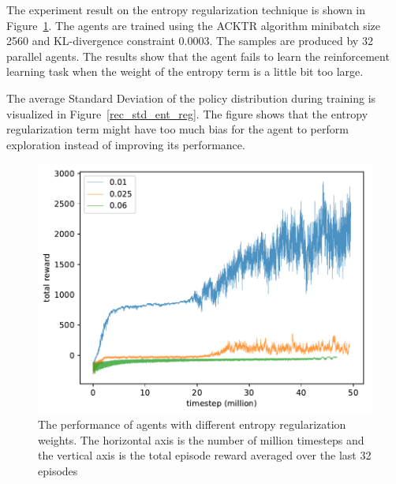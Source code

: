 The experiment result on the entropy regularization technique is shown in Figure~\ref{rec_ent_reg}. The agents are trained using the ACKTR algorithm minibatch size 2560 and KL-divergence constraint 0.0003. The samples are produced by 32 parallel agents. The results show that the agent fails to learn the reinforcement learning task when the weight of the entropy term is a little bit too large. 

The average Standard Deviation of the policy distribution during training is visualized in Figure~\ref{rec_std_ent_reg}. The figure shows that the entropy regularization term might have too much bias for the agent to perform exploration instead of improving its performance.
\begin{figure}[!htbp]
	\includegraphics[width=\textwidth]{images/rec_180609_ent_reg.pdf}
	\centering
	\caption{The performance of agents with different entropy regularization weights. The horizontal axis is the number of million timesteps and the vertical axis is the total episode reward averaged over the last 32 episodes}\label{rec_ent_reg}
\end{figure}

